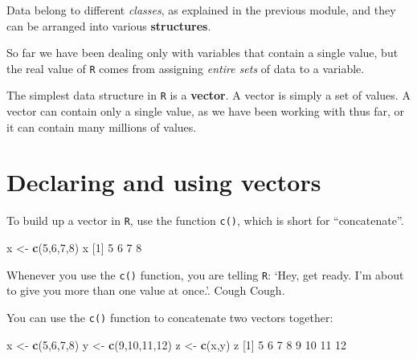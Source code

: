 \documentclass[
]{book}
\newenvironment{Shaded}{\begin{snugshade}}{\end{snugshade}}
\newcommand{\DecValTok}[1]{\textcolor[rgb]{0.00,0.00,0.81}{#1}}
\newcommand{\FunctionTok}[1]{\textcolor[rgb]{0.13,0.29,0.53}{\textbf{#1}}}
\newcommand{\NormalTok}[1]{#1}
\newcommand{\OtherTok}[1]{\textcolor[rgb]{0.56,0.35,0.01}{#1}}
\begin{document}
Data belong to different \emph{classes}, as explained in the previous module, and they can be arranged into various \textbf{structures}.

So far we have been dealing only with variables that contain a single value, but the real value of \texttt{R} comes from assigning \emph{entire sets} of data to a variable.

The simplest data structure in \texttt{R} is a \textbf{vector}. A vector is simply a set of values. A vector can contain only a single value, as we have been working with thus far, or it can contain many millions of values.

\section*{Declaring and using vectors}\label{declaring-and-using-vectors}

To build up a vector in \texttt{R}, use the function \texttt{c()}, which is short for ``concatenate''.

\begin{Shaded}
\begin{Highlighting}[]
\NormalTok{x }\OtherTok{\textless{}{-}} \FunctionTok{c}\NormalTok{(}\DecValTok{5}\NormalTok{,}\DecValTok{6}\NormalTok{,}\DecValTok{7}\NormalTok{,}\DecValTok{8}\NormalTok{)}
\NormalTok{x}
\NormalTok{[}\DecValTok{1}\NormalTok{] }\DecValTok{5} \DecValTok{6} \DecValTok{7} \DecValTok{8}
\end{Highlighting}
\end{Shaded}

Whenever you use the \texttt{c()} function, you are telling \texttt{R}: `Hey, get ready. I'm about to give you more than one value at once.'. Cough Cough.

You can use the \texttt{c()} function to concatenate two vectors together:

\begin{Shaded}
\begin{Highlighting}[]
\NormalTok{x }\OtherTok{\textless{}{-}} \FunctionTok{c}\NormalTok{(}\DecValTok{5}\NormalTok{,}\DecValTok{6}\NormalTok{,}\DecValTok{7}\NormalTok{,}\DecValTok{8}\NormalTok{)}
\NormalTok{y }\OtherTok{\textless{}{-}} \FunctionTok{c}\NormalTok{(}\DecValTok{9}\NormalTok{,}\DecValTok{10}\NormalTok{,}\DecValTok{11}\NormalTok{,}\DecValTok{12}\NormalTok{)}
\NormalTok{z }\OtherTok{\textless{}{-}} \FunctionTok{c}\NormalTok{(x,y)}
\NormalTok{z}
\NormalTok{[}\DecValTok{1}\NormalTok{]  }\DecValTok{5}  \DecValTok{6}  \DecValTok{7}  \DecValTok{8}  \DecValTok{9} \DecValTok{10} \DecValTok{11} \DecValTok{12}
\end{Highlighting}
\end{Shaded}
\end{document}
